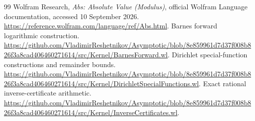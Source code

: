 \documentclass[11pt]{article}
\theoremstyle{remark}\newtheorem{remark}[theorem]{Remark}
\begin{document}
\begin{thebibliography}{99}
 Wolfram Research, \emph{Abs: Absolute Value (Modulus)}, official
Wolfram Language documentation, accessed 10 September 2026.
\url{https://reference.wolfram.com/language/ref/Abs.html}.
 Barnes forward logarithmic construction.
\url{https://github.com/VladimirReshetnikov/Asymptotic/blob/8e859961d7d37f008b826f3a8cad406460271614/src/Kernel/BarnesForward.wl}.
 Dirichlet special-function constructions and remainder bounds.
\url{https://github.com/VladimirReshetnikov/Asymptotic/blob/8e859961d7d37f008b826f3a8cad406460271614/src/Kernel/DirichletSpecialFunctions.wl}.
 Exact rational inverse-certificate arithmetic.
\url{https://github.com/VladimirReshetnikov/Asymptotic/blob/8e859961d7d37f008b826f3a8cad406460271614/src/Kernel/InverseCertificates.wl}.
\end{thebibliography}
\end{document}
